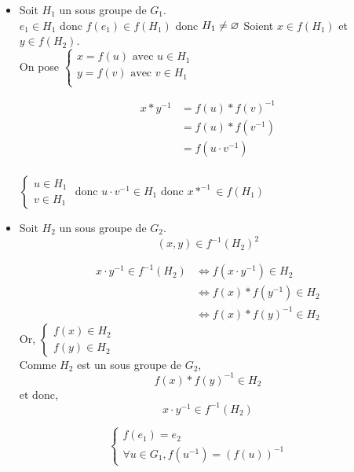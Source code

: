\begin{prv}
	\begin{itemize}
		\item Soit $H_1$ un sous groupe de $G_1$.\\
			$e_1 \in H_1$ donc $f(e_1) \in f(H_1)$ donc $H_1 \neq \varnothing$
			Soient $x \in f(H_1)$ et $y \in f(H_2)$.\\
			On pose $\begin{cases}
				x = f(u) \text{ avec } u \in H_1\\
				y = f(v) \text{ avec } v \in H_1\\
			\end{cases}$

			\begin{align*}
				x * y^{-1} &= f(u) * f(v) ^{-1} \\
				&= f(u) * f\left( v^{-1} \right) \\
				&= f\left(u \cdot v^{-1}\right) \\
			\end{align*}

			$\begin{cases}
				u \in H_1\\
				v \in H_1
			\end{cases}$ donc $u \cdot v^{-1} \in H_1$ donc $x * ^{-1} \in f(H_1)$
		\item Soit $H_2$ un sous groupe de $G_2$. \[
				(x,y) \in f^{-1}\left( H_2 \right) ^2
		\] 

		\begin{align*}
			x \cdot y ^{-1} \in f^{-1}(H_2) &\iff f\left(x \cdot y^{-1}\right) \in H_2\\
				&\iff f(x) * f\left( y^{-1} \right) \in H_2\\
				&\iff f(x) * f(y) ^{-1} \in H_2
		\end{align*}
		Or, $\begin{cases}
			f(x) \in H_2\\
			f(y) \in H_2
		\end{cases}$ \\
		Comme $H_2$ est un sous groupe de $G_2$, \[
			f(x) * f(y) ^{-1} \in H_2
		\] et donc, \[
			x \cdot y ^{-1} \in f^{-1}\left( H_2 \right)
		\]
	\end{itemize}
\end{prv}

\begin{lem}
	\[
	\begin{cases}
		f(e_1) = e_2\\
		\forall u \in G_1, f\left(u^{-1}\right) = \left( f(u) \right) ^{-1}
	\end{cases}
	\] 
\end{lem}

